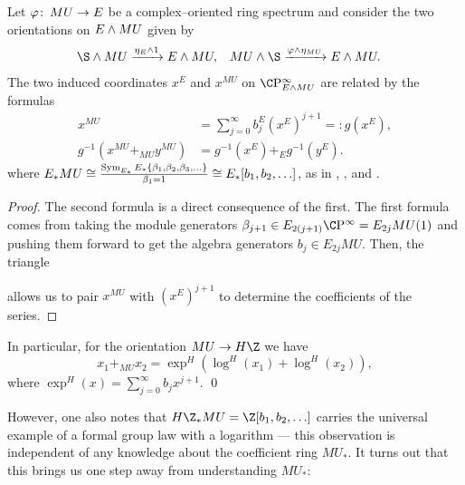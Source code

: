 \begin{lemma}\label{OrientationsOnEAndMU}
Let $\varphi\colon\thinspace MU \to E$ be a complex--oriented ring spectrum and consider the two orientations on $E \wedge MU$ given by
\begin{align*}
\S \sm MU & \xrightarrow{\eta_E \sm 1} E \sm MU, &
MU \sm \S & \xrightarrow{\phi \sm \eta_{MU}} E \sm MU.
\end{align*}
The two induced coordinates $x^E$ and $x^{MU}$ on $\CP^\infty_{E \sm MU}$ are related by the formulas
\begin{align*}
x^{MU} & = \sum_{j=0}^\infty b_j^E (x^E)^{j+1} =: g(x^E), \\
g^{-1}(x^{MU} +_{MU} y^{MU}) & = g^{-1}(x^E) +_E g^{-1}(y^E).
\end{align*}
where $E_* MU \cong \frac{\operatorname{Sym}_{E_*} E_*\{\beta_1, \beta_2, \beta_3, \ldots\}}{\beta_1 = 1} \cong E_*[b_1, b_2, \ldots]$, as in , , and .
\end{lemma}
\begin{proof}
The second formula is a direct consequence of the first.  The first formula comes from taking the module generators $\beta_{j+1} \in E_{2(j+1)} \CP^\infty = E_{2j} MU(1)$ and pushing them forward to get the algebra generators $b_j \in E_{2j} MU$.  Then, the triangle
\begin{center}
\end{center}
allows us to pair $x^{MU}$ with $(x^E)^{j+1}$ to determine the coefficients of the series.
\end{proof}

\begin{corollary}\label{HZMUCarriesALog}
In particular, for the orientation $MU \to H\Z$ we have \[x_1 +_{MU} x_2 = \exp^H(\log^H(x_1) + \log^H(x_2)),\] where $\exp^H(x) = \sum_{j=0}^\infty b_j x^{j+1}$. \qed
\end{corollary}

However, one also notes that $H\Z_* MU = \Z[b_1, b_2, \ldots]$ carries the universal example of a formal group law with a logarithm --- this observation is independent of any knowledge about the coefficient ring $MU_*$.  It turns out that this brings us one step away from understanding $MU_*$:

